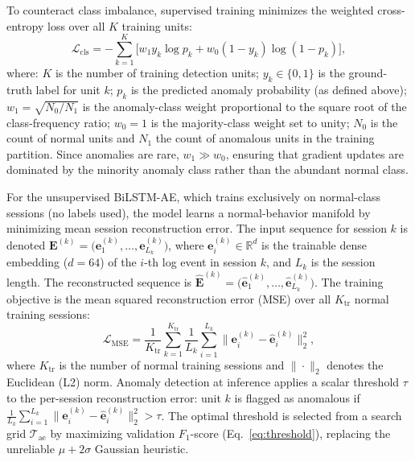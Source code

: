 \documentclass{elektr}
\begin{document}
To counteract class imbalance, supervised training minimizes the weighted
cross-entropy loss over all $K$ training units:
\begin{equation}
\mathcal{L}_{\text{cls}} = -\sum_{k=1}^{K}\bigl[
    w_1 y_k\log p_k + w_0(1{-}y_k)\log(1{-}p_k)\bigr],
\label{eq:cls_loss}
\end{equation}
where: $K$ is the number of training detection units; $y_k\in\{0,1\}$ is the
ground-truth label for unit $k$; $p_k$ is the predicted anomaly probability (as defined above);
$w_1 = \sqrt{N_0/N_1}$ is the anomaly-class weight proportional to the square root of the class-frequency ratio;
$w_0 = 1$ is the majority-class weight set to unity; $N_0$ is the count of normal units
and $N_1$ the count of anomalous units in the training partition.
Since anomalies are rare, $w_1 \gg w_0$, ensuring that gradient updates are dominated by the minority anomaly class rather than the abundant normal class.

For the unsupervised BiLSTM-AE, which trains exclusively on normal-class sessions
(no labels used), the model learns a normal-behavior manifold by minimizing mean
session reconstruction error. The input sequence for session $k$ is denoted
$\mathbf{E}^{(k)}=\bigl(\mathbf{e}^{(k)}_1,\ldots,\mathbf{e}^{(k)}_{L_k}\bigr)$,
where $\mathbf{e}^{(k)}_i\in\mathbb{R}^d$ is the trainable dense embedding
($d{=}64$) of the $i$-th log event in session $k$, and $L_k$ is the session
length. The reconstructed sequence is
$\hat{\mathbf{E}}^{(k)}=\bigl(\hat{\mathbf{e}}^{(k)}_1,\ldots,\hat{\mathbf{e}}^{(k)}_{L_k}\bigr)$.
The training objective is the mean squared reconstruction error (MSE) over all
$K_{\mathrm{tr}}$ normal training sessions:
\begin{equation}
\mathcal{L}_{\text{MSE}} = \frac{1}{K_{\mathrm{tr}}}\sum_{k=1}^{K_{\mathrm{tr}}}
\frac{1}{L_k}\sum_{i=1}^{L_k}
\bigl\|\mathbf{e}^{(k)}_i - \hat{\mathbf{e}}^{(k)}_i\bigr\|^2_2,
\label{eq:mse_def}
\end{equation}
where $K_{\mathrm{tr}}$ is the number of normal training sessions and
$\|\cdot\|_2$ denotes the Euclidean (L2) norm. Anomaly detection at inference
applies a scalar threshold $\tau$ to the per-session reconstruction error: unit
$k$ is flagged as anomalous if
$\frac{1}{L_k}\sum_{i=1}^{L_k}\|\mathbf{e}^{(k)}_i-\hat{\mathbf{e}}^{(k)}_i\|^2_2>\tau$.
The optimal threshold is selected from a search grid $\mathcal{T}_{\text{ae}}$ by maximizing
validation $F_1$-score (Eq.~\ref{eq:threshold}), replacing the unreliable
$\mu{+}2\sigma$ Gaussian heuristic.
\end{document}
